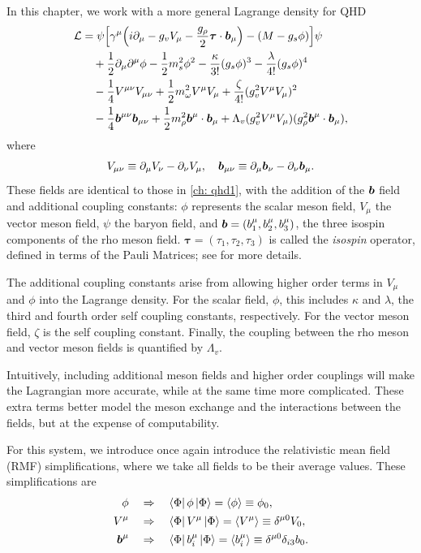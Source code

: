 In this chapter, we work with a more general Lagrange density for QHD
\begin{align}
    \Lag & = \psi \bqty{\gamma^\mu\qty(i\p_\mu -g_vV_\mu - \frac{g_\rho}{2}{\boldsymbol\tau}\cdot {\boldsymbol b}_\mu)-(M-g_s\phi)}\psi\nonumber\\
    & \quad + \frac{1}{2}\p_\mu \p^\mu \phi - \frac{1}{2}m_s^2\phi^2 - \frac{\kappa}{3!}(g_s\phi)^3 - \frac{\lambda}{4!}(g_s\phi)^4 \nonumber\\
    & \quad - \frac{1}{4} V^{\mu\nu}V_{\mu\nu} + \frac{1}{2} m_\omega^2 V^\mu V_\mu + \frac{\zeta}{4!}(g_v^2 V^\mu V_\mu)^2 \nonumber\\
    & \quad - \frac{1}{4} \B^{\mu\nu} \B_{\mu\nu} + \frac{1}{2}m_\rho^2 \B^\mu \cdot \B_\mu + \Lambda_v (g_v^2 V^\mu V_\mu)(g_\rho^2 \B^\mu \cdot \B_\mu),
\end{align}
where
\begin{align*}
    V_{\mu\nu} \equiv \partial_\mu V_\nu - \partial_\nu V_\mu, \quad
    {\boldsymbol b}_{\mu\nu} \equiv \partial_\mu {\boldsymbol b}_\nu - \partial_\nu {\boldsymbol b}_\mu.
\end{align*}
These fields are identical to those in \autoref{ch: qhd1}, with the addition of the ${\boldsymbol b}$ field and additional coupling constants: $\phi$ represents the scalar meson field, $V_\mu$ the vector meson field, $\psi$ the baryon field, and ${\boldsymbol b} = (b^\mu_1, b_2^\mu, b_3^\mu)$, the three isospin components of the rho meson field. ${\boldsymbol\tau} = (\tau_1, \tau_2, \tau_3)$ is called the \textit{isospin} operator, defined in terms of the Pauli Matrices; see \autocite[pp. 72-73]{diener_2008} for more details. 

The additional coupling constants arise from allowing higher order terms in $V_\mu$ and $\phi$ into the Lagrange density. For the scalar field, $\phi$, this includes $\kappa$ and $\lambda$, the third and fourth order self coupling constants, respectively. For the vector meson field, $\zeta$ is the self coupling constant. Finally, the coupling between the rho meson and vector meson fields is quantified by $\Lambda_v$.

Intuitively, including additional meson fields and higher order couplings will make the Lagrangian more accurate, while at the same time more complicated. These extra terms better model the meson exchange and the interactions between the fields, but at the expense of computability.

For this system, we introduce once again introduce the relativistic mean field (RMF) simplifications, where we take all fields to be their average values. These simplifications are
\begin{align}
    \phi &\quad\Rightarrow\quad \bra{\Phi} \phi \ket{\Phi} = \expval{\phi} \equiv \phi_0, \\
    V^\mu & \quad\Rightarrow\quad \bra{\Phi} V^\mu \ket{\Phi} = \expval{V^\mu} \equiv \delta^{\mu 0} V_0,\\
    {\boldsymbol b}^\mu & \quad\Rightarrow\quad \bra{\Phi} b^\mu_i \ket{\Phi} = \expval{b^\mu_i} \equiv \delta^{\mu 0} \delta_{i3} b_0.
\end{align}

